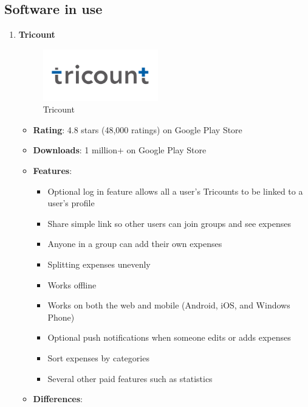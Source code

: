 \documentclass[conference]{IEEEtran}
\begin{document}
\subsection{Software in use}
\begin{enumerate}
    \item \textbf{Tricount} \\
        \begin{figure}[htbp]
            \centerline{\includegraphics[width=50mm,scale=0.5]{img/logo-tricount.png}}
            \caption{Tricount}
            \label{fig:tricount-logo}
        \end{figure}
        \begin{itemize}
            \item \textbf{Rating}: 4.8 stars (48,000 ratings) on Google Play Store
            \item \textbf{Downloads}: 1 million+ on Google Play Store
            \item \textbf{Features}:
                \begin{itemize}
                    \item Optional log in feature allows all a user's Tricounts to be linked to a user's profile
                    \item Share simple link so other users can join groups and see expenses
                    \item Anyone in a group can add their own expenses
                    \item Splitting expenses unevenly
                    \item Works offline
                    \item Works on both the web and mobile (Android, iOS, and Windows Phone)
                    \item Optional push notifications when someone edits or adds expenses
                    \item Sort expenses by categories
                    \item Several other paid features such as statistics
                \end{itemize}
            \item \textbf{Differences}:
                \begin{itemize}

\end{itemize}
\end{itemize}
\end{enumerate}
\end{document}
